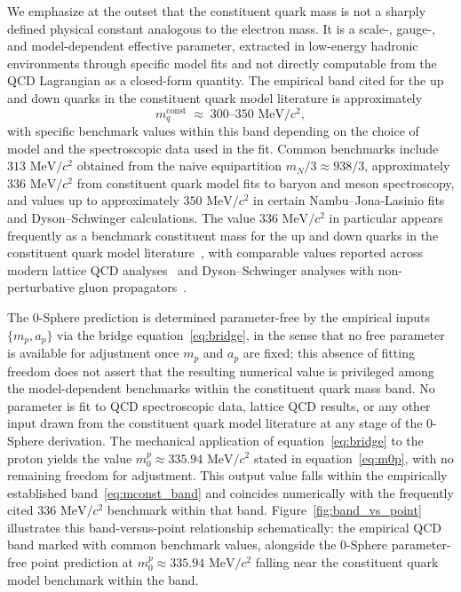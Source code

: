 \documentclass[%
 reprint, amsmath,amssymb, aps, prc, ]{revtex4-2}
\numberwithin{equation}{section}
\begin{document}
We emphasize at the outset that the constituent quark mass is not a sharply defined physical constant analogous to the electron mass.
It is a scale-, gauge-, and model-dependent effective parameter, extracted in low-energy hadronic environments through specific model fits and not directly computable from the QCD Lagrangian as a closed-form quantity.
The empirical band cited for the up and down quarks in the constituent quark model literature is approximately
\begin{equation}
m_q^{\text{const}} \;\approx\; 300\text{--}350 \text{ MeV}/c^2,
\label{eq:mconst_band}
\end{equation}
with specific benchmark values within this band depending on the choice of model and the spectroscopic data used in the fit.
Common benchmarks include $313 \text{ MeV}/c^2$ obtained from the naive equipartition $m_N / 3 \approx 938/3$, approximately $336 \text{ MeV}/c^2$ from constituent quark model fits to baryon and meson spectroscopy, and values up to approximately $350 \text{ MeV}/c^2$ in certain Nambu--Jona-Lasinio fits and Dyson--Schwinger calculations.
The value $336 \text{ MeV}/c^2$ in particular appears frequently as a benchmark constituent mass for the up and down quarks in the constituent quark model literature~\cite{HalzenMartin,Griffiths,EntemReview}, with comparable values reported across modern lattice QCD analyses~\cite{FLAG,BMW2008} and Dyson--Schwinger analyses with non-perturbative gluon propagators~\cite{AguilarPapavassiliou}.

The 0-Sphere prediction is determined parameter-free by the empirical inputs $\{m_p, a_p\}$ via the bridge equation~\eqref{eq:bridge}, in the sense that no free parameter is available for adjustment once $m_p$ and $a_p$ are fixed; this absence of fitting freedom does not assert that the resulting numerical value is privileged among the model-dependent benchmarks within the constituent quark mass band.
No parameter is fit to QCD spectroscopic data, lattice QCD results, or any other input drawn from the constituent quark model literature at any stage of the 0-Sphere derivation.
The mechanical application of equation~\eqref{eq:bridge} to the proton yields the value $m_0^p \approx 335.94 \text{ MeV}/c^2$ stated in equation~\eqref{eq:m0p}, with no remaining freedom for adjustment.
This output value falls within the empirically established band~\eqref{eq:mconst_band} and coincides numerically with the frequently cited $336 \text{ MeV}/c^2$ benchmark within that band.
Figure~\ref{fig:band_vs_point} illustrates this band-versus-point relationship schematically: the empirical QCD band marked with common benchmark values, alongside the 0-Sphere parameter-free point prediction at $m_0^p \approx 335.94 \text{ MeV}/c^2$ falling near the constituent quark model benchmark within the band.
\end{document}
